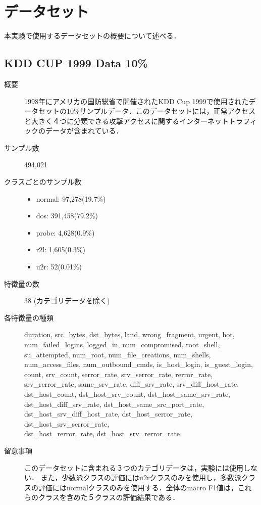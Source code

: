 \section{データセット}
本実験で使用するデータセットの概要について述べる．

\subsection{KDD CUP 1999 Data 10\%}
\begin{description}
    \item[概要] 1998年にアメリカの国防総省で開催されたKDD Cup 1999で使用されたデータセットの10\%サンプルデータ．このデータセットには，正常アクセスと大きく４つに分類できる攻撃アクセスに関するインターネットトラフィックのデータが含まれている．
    \item[サンプル数] 494,021
    \item[クラスごとのサンプル数] \mbox{}
        \begin{itemize}
            \item normal:  97,278(19.7\%)
            \item dos:      391,458(79.2\%)
            \item probe:    4,628(0.9\%)
            \item r2l:      1,605(0.3\%)
            \item u2r:      52(0.01\%)
        \end{itemize}
    \item[特徴量の数] 38 (カテゴリデータを除く)
    \item[各特徴量の種類] \mbox{}
            duration, src\_bytes, dst\_bytes, land, wrong\_fragment, urgent, hot, num\_failed\_logins, logged\_in, num\_compromised, root\_shell, su\_attempted, num\_root, num\_file\_creations, num\_shells, num\_access\_files, num\_outbound\_cmds, is\_host\_login, is\_guest\_login, count, srv\_count, serror\_rate, srv\_serror\_rate, rerror\_rate, srv\_rerror\_rate, same\_srv\_rate, diff\_srv\_rate, srv\_diff\_host\_rate, dst\_host\_count, dst\_host\_srv\_count, dst\_host\_same\_srv\_rate, dst\_host\_diff\_srv\_rate, dst\_host\_same\_src\_port\_rate, \\dst\_host\_srv\_diff\_host\_rate, dst\_host\_serror\_rate, dst\_host\_srv\_serror\_rate, \\dst\_host\_rerror\_rate, dst\_host\_srv\_rerror\_rate
    \item[留意事項] このデータセットに含まれる３つのカテゴリデータは，実験には使用しない．
                   また，少数派クラスの評価にはu2rクラスのみを使用し，多数派クラスの評価にはnormalクラスのみを使用する．全体のmacro F1値は，これらのクラスを含めた５クラスの評価結果である．
\end{description}


